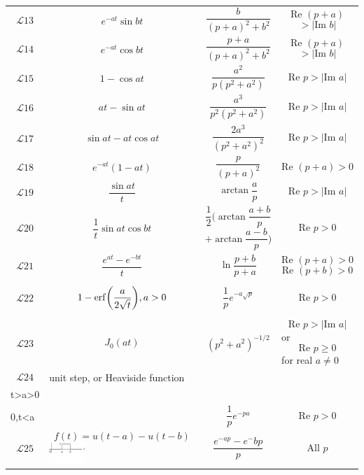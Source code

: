 \documentclass[../main.tex]{subfiles}
\begin{document}
\begin{longtable}{m{}m{}  m{}m{}}
            \[\mathcal{L}13\] & \centering \[e^{-at}\sin bt\] & \centering \[\frac{b}{(p+a)^2+b^2}\] & \[\text{Re }(p+a)\]\[>|\text{Im }b|\]\\
            \[\mathcal{L}14\] & \centering \[e^{-at}\cos bt\] & \centering \[\frac{p+a}{(p+a)^2+b^2}\] & \[\text{Re }(p+a)\]\[>|\text{Im }b|\]\\
            \[\mathcal{L}15\] & \centering \[1 - \cos at\] & \centering \[\frac{a^2}{p(p^2+a^2)}\] & \[\text{Re }p>|\text{Im } a|\]\\
            \[\mathcal{L}16\] & \centering \[at - \sin at\] & \centering \[\frac{a^3}{p^2(p^2+a^2)}\] & \[\text{Re }p>|\text{Im } a|\]\\
            \[\mathcal{L}17\] & \centering \[\sin at - at \cos at\] & \centering \[\frac{2a^3}{(p^2+a^2)^2}\] & \[\text{Re }p>|\text{Im } a|\]\\
            \[\mathcal{L}18\] & \centering \[e^{-at}(1 - at) \] & \centering \[\frac{p}{(p+a)^2}\] & \[\text{Re }(p+a)>0\]\\
            \[\mathcal{L}19\] & \centering \[\frac{\sin at}{t}\] & \centering \[\arctan \frac{a}{p}\] & \[\text{Re }p>|\text{Im } a|\]\\
            \[\mathcal{L}20\] & \centering \[\frac{1}{t}\sin at\cos bt\] & \centering \[\frac{1}{2}\biggl(\arctan \frac{a+b}{p}\] \[+\arctan \frac{a-b}{p}\biggr)\]& \[\text{Re }p>0\]\\
            \[\mathcal{L}21\] & \centering \[\frac{e^{at}-e^{-bt}}{t}\] & \centering \[\ln\frac{p+b}{p+a}\]& \[\text{Re }(p+a)>0\] \[\text{Re }(p+b)>0\]\\
            \[\mathcal{L}22\] & \centering \[1-\operatorname{erf}\biggl(\frac{a}{2\sqrt{t}}\biggr),a>0\] & \centering \[\frac{1}{p}e^{-a\sqrt{p}}\] & \[\text{Re }p>0\]\\
            \[\mathcal{L}23\] & \centering \[J_0(at)\] & \centering \[(p^2+a^2)^{-1/2}\] & \[\text{Re }p>|\text{Im }a|\] or \[\text{Re }p\geq0\] for real \(a\neq0\)\\
            \[\mathcal{L}24\] & \centering unit step, or Heaviside function \[u(t-a)=\begin{cases}
                1,\\t>a>0&\\0,t<a& \end{cases}\] & \centering \[\frac{1}{p}e^{-pa}\] & \[\text{Re }p>0\]\\
            \[\mathcal{L}25\] & \centering \[f(t)=u(t-a)-u(t-b)\]\includegraphics[width=0.25\textwidth]{../Rss/ODE/L25} & \centering \[\frac{e^{-ap}-e^-bp}{p}\] & \[\text{All }p\]\\

\end{longtable}
\end{document}
